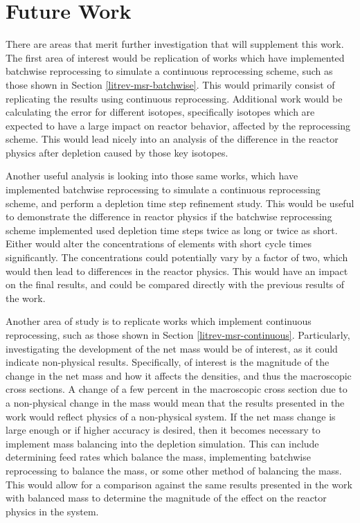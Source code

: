 \section{Future Work}

There are areas that merit further investigation that will supplement this work.
The first area of interest would be replication of works which have implemented batchwise reprocessing to simulate a continuous reprocessing scheme, such as those shown in Section \ref{litrev-msr-batchwise}.
This would primarily consist of replicating the results using continuous reprocessing.
Additional work would be calculating the error for different isotopes, specifically isotopes which are expected to have a large impact on reactor behavior, affected by the reprocessing scheme.
This would lead nicely into an analysis of the difference in the reactor physics after depletion caused by those key isotopes.

Another useful analysis is looking into those same works, which have implemented batchwise reprocessing to simulate a continuous reprocessing scheme, and perform a depletion time step refinement study.
This would be useful to demonstrate the difference in reactor physics if the batchwise reprocessing scheme implemented used depletion time steps twice as long or twice as short.
Either would alter the concentrations of elements with short cycle times significantly.
The concentrations could potentially vary by a factor of two, which would then lead to differences in the reactor physics.
This would have an impact on the final results, and could be compared directly with the previous results of the work.

Another area of study is to replicate works which implement continuous reprocessing, such as those shown in Section \ref{litrev-msr-continuous}.
Particularly, investigating the development of the net mass would be of interest, as it could indicate non-physical results.
Specifically, of interest is the magnitude of the change in the net mass and how it affects the densities, and thus the macroscopic cross sections.
A change of a few percent in the macroscopic cross section due to a non-physical change in the mass would mean that the results presented in the work would reflect physics of a non-physical system.
If the net mass change is large enough or if higher accuracy is desired, then it becomes necessary to implement mass balancing into the depletion simulation.
This can include determining feed rates which balance the mass, implementing batchwise reprocessing to balance the mass, or some other method of balancing the mass.
This would allow for a comparison against the same results presented in the work with balanced mass to determine the magnitude of the effect on the reactor physics in the system.

